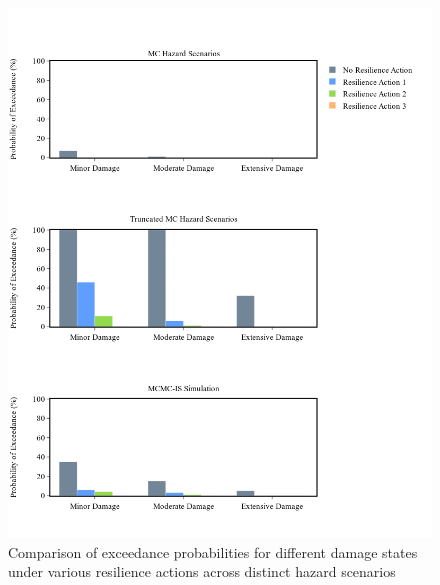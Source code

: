     \begin{figure}[H]
        \centering
        \includegraphics[scale=0.4]{Figures/Images/Hazard Scenario Selection/exceedance_probabilities.png}
        \caption{Comparison of exceedance probabilities for different damage states under various resilience actions across distinct hazard scenarios}
        \label{fig:exceedance_probabilities}
    \end{figure}